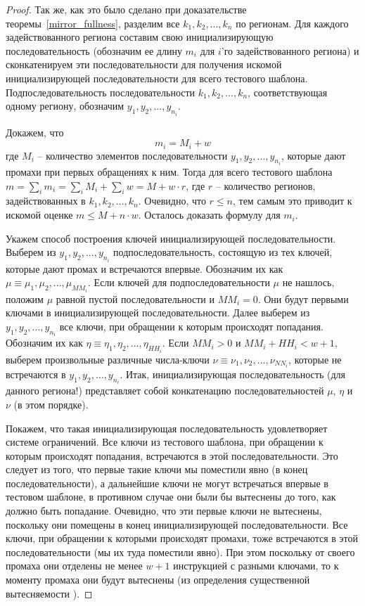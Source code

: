 \begin{proof}
  Так же, как это было сделано при доказательстве
  теоремы~\ref{mirror_fullness}, разделим все $k_1, k_2, ..., k_n$
  по регионам. Для каждого задействованного региона составим свою
  инициализирующую последовательность (обозначим ее длину $m_i$
  для $i$'го задействованного региона) и сконкатенируем эти
  последовательности для получения искомой инициализирующей последовательности
   для всего тестового шаблона.
  Подпоследовательность последовательности $k_1, k_2, ..., k_n$,
  соответствующая одному региону, обозначим $y_1, y_2, ...,
  y_{n_i}$.

  Докажем, что $$m_i = M_i + w$$ где $M_i$ -- количество
  элементов последовательности $y_1, y_2, ..., y_{n_i}$, которые дают
  промахи при первых обращениях к ним. Тогда для всего тестового
  шаблона $m = \sum\limits_i m_i = \sum\limits_i M_i + \sum\limits_i w =
  M + w \cdot r$, где $r$ -- количество регионов, задействованных в
  $k_1, k_2, ..., k_n$. Очевидно, что $r \leqslant n$, тем самым это
  приводит к искомой оценке $m \leqslant M + n \cdot w$. Осталось
  доказать формулу для $m_i$.

  Укажем способ построения ключей инициализирующей последовательности. Выберем из $y_1, y_2, ..., y_{n_i}$ подпоследовательность,
  состоящую из тех ключей, которые дают промах и встречаются
  впервые. Обозначим их как $\mu \equiv \mu_1, \mu_2, ..., \mu_{MM_i}$. Если ключей для подпоследовательности $\mu$ не нашлось, положим $\mu$ равной пустой последовательности и $MM_i = 0$. Они будут первыми ключами в   инициализирующей последовательности. Далее выберем из $y_1, y_2, ..., y_{n_i}$
  все ключи, при обращении к которым происходят попадания.
  Обозначим их как $\eta \equiv \eta_1, \eta_2, ..., \eta_{HH_i}$. Если $MM_i > 0$ и $MM_i +
  HH_i < w + 1$, выберем произвольные различные числа-ключи $\nu \equiv \nu_1, \nu_2,
  ..., \nu_{NN_i}$, которые не встречаются в $y_1, y_2, ..., y_{n_i}$. Итак, инициализирующая последовательность (для данного региона!) представляет собой конкатенацию последовательностей $\mu$, $\eta$ и $\nu$ (в этом порядке).

  Покажем, что такая инициализирующая последовательность удовлетворяет системе ограничений. Все ключи из тестового шаблона, при обращении к которым происходят попадания, встречаются в
  этой последовательности. Это следует из того, что первые такие ключи мы поместили явно (в конец последовательности), а дальнейшие ключи не могут встречаться впервые в тестовом шаблоне, в противном случае они были бы вытеснены до того, как должно быть попадание. Очевидно, что эти первые ключи не вытеснены, поскольку они помещены в конец инициализирующей последовательности. Все ключи, при обращении к которыми происходят промахи, тоже встречаются в этой последовательности (мы их туда поместили явно). При этом поскольку от своего промаха они отделены не менее $w+1$ инструкцией с разными ключами, то к моменту промаха они будут вытеснены (из определения существенной вытесняемости \LRU).


\end{proof}
